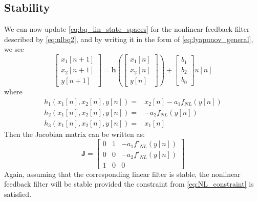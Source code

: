 \documentclass[twoside,a4paper]{article}
\begin{document}
\subsection{Stability}
%
We can now update \cref{eq:bq_lin_state_spaces} for the nonlinear
feedback filter described by \cref{eq:nlbq2}, and by writing it in the form
of \cref{eq:lyapunov_general}, we see
%
\begin{equation}
    \begin{bmatrix} x_1[n+1] \\ x_2[n+1] \\ y[n+1] \end{bmatrix} =
    \mathbf{h} \left( \begin{bmatrix} x_1[n] \\ x_2[n] \\ y[n] \end{bmatrix}
    \right) + \begin{bmatrix} b_1\\ b_2\\ b_0 \end{bmatrix} u[n]
    \label{eq:nlbq2_states}
\end{equation}
%
where
%
\begin{equation}
    \begin{split}
        h_1(x_1[n], x_2[n], y[n]) =& x_2[n] - a_1f_{NL}(y[n]) \\
        h_2(x_1[n], x_2[n], y[n]) =& -a_2f_{NL}(y[n]) \\
        h_3(x_1[n], x_2[n], y[n]) =& x_1[n]
    \end{split}
    \label{eq:nlbq2_state_eqns2}
\end{equation}
%
Then the Jacobian matrix can be written as:
%
\begin{equation}
    \mathbf{J} = \begin{bmatrix}
        0& 1& -a_1f'_{NL}(y[n]) \\
        0& 0& -a_2f'_{NL}(y[n]) \\
        1& 0& 0
    \end{bmatrix}
    \label{eq:nlbq2_Jacobian}
\end{equation}
%
Again, assuming that the corresponding linear filter is stable, the
nonlinear feedback filter will be stable provided the constraint
from \cref{eq:NL_constraint} is satisfied.
%
\end{document}
